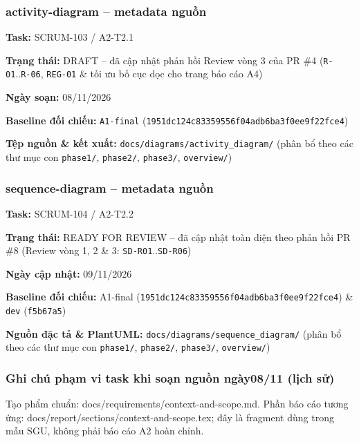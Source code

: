 \subsubsection{activity-diagram -- metadata nguồn}
\noindent\textbf{Task:} SCRUM-103 / A2-T2.1\par
\noindent\textbf{Trạng thái:} DRAFT -- đã cập nhật phản hồi Review vòng 3 của PR \#4 (\texttt{R-01}..\texttt{R-06}, \texttt{REG-01} \& tối ưu bố cục dọc cho trang báo cáo A4)\par
\noindent\textbf{Ngày soạn:} 08/11/2026\par
\noindent\textbf{Baseline đối chiếu:} \texttt{A1-final} (\texttt{1951dc124c83359556f04adb6ba3f0ee9f22fce4})\par
\noindent\textbf{Tệp nguồn \& kết xuất:} \texttt{docs/diagrams/activity\_diagram/} (phân bổ theo các thư mục con \texttt{phase1/}, \texttt{phase2/}, \texttt{phase3/}, \texttt{overview/})\par


\subsubsection{sequence-diagram -- metadata nguồn}
\noindent\textbf{Task:} SCRUM-104 / A2-T2.2\par
\noindent\textbf{Trạng thái:} READY FOR REVIEW -- đã cập nhật toàn diện theo phản hồi PR \#8 (Review vòng 1, 2 \& 3: \texttt{SD-R01}..\texttt{SD-R06})\par
\noindent\textbf{Ngày cập nhật:} 09/11/2026\par
\noindent\textbf{Baseline đối chiếu:} A1-final (\texttt{1951dc124c83359556f04adb6ba3f0ee9f22fce4}) \& \texttt{dev} (\texttt{f5b67a5})\par
\noindent\textbf{Nguồn đặc tả \& PlantUML:} \texttt{docs/diagrams/sequence\_diagram/} (phân bổ theo các thư mục con \texttt{phase1/}, \texttt{phase2/}, \texttt{phase3/}, \texttt{overview/})\par


\subsubsection{Ghi chú phạm vi task khi soạn nguồn ngày08/11 (lịch sử)}


Tạo phẩm chuẩn: docs/requirements/context-and-scope.md. Phần báo cáo tương ứng: docs/report/sections/context-and-scope.tex; đây là fragment dùng trong mẫu SGU, không phải báo cáo A2 hoàn chỉnh.
\par

